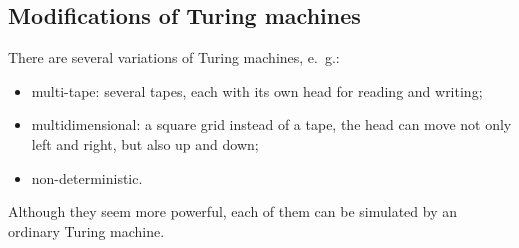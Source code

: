 \subsection{Modifications of Turing machines}
There are several variations of Turing machines, e.~g.:
\begin{itemize}
\item
multi-tape: several tapes, each with its own head for reading and writing;
\item
multidimensional: a square grid instead of a tape, the head can move not only left and right, but also up and down;
\item
non-deterministic.
\end{itemize}
Although they seem more powerful, each of them can be simulated by an ordinary Turing machine.


